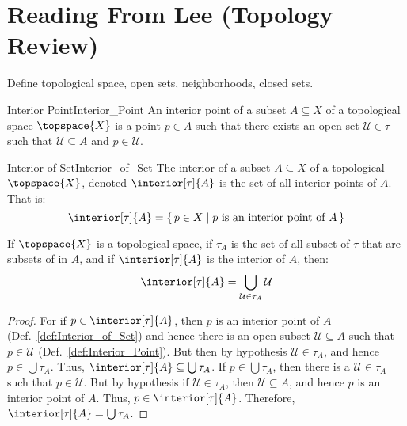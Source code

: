 \documentclass{article}                                                        %
\begin{document}
    \section{Reading From Lee (Topology Review)}
        Define topological space, open sets, neighborhoods, closed sets.
        \begin{fdefinition}{Interior Point}{Interior_Point}
            An interior point of a subset $A\subseteq{X}$ of a topological space
            $\topspace{X}$ is a point $p\in{A}$ such that there exists an open
            set $\mathcal{U}\in\tau$ such that $\mathcal{U}\subseteq{A}$ and
            $p\in\mathcal{U}$.
        \end{fdefinition}
        \begin{fdefinition}{Interior of Set}{Interior_of_Set}
            The interior of a subset $A\subseteq{X}$ of a topological
            $\topspace{X}$, denoted $\interior[\tau]{A}$ is the set of all
            interior points of $A$. That is:
            \begin{equation*}
                \interior[\tau]{A}=\{\,p\in{X}\;|\;p
                    \textrm{ is an interior point of }A\,\}
            \end{equation*}
        \end{fdefinition}
        \begin{theorem}
            If $\topspace{X}$ is a topological space, if
            $\tau_{A}$ is the set of all subset of $\tau$ that are subsets of
            in $A$, and if $\interior[\tau]{A}$ is the interior of $A$, then:
            \begin{equation}
                \interior[\tau]{A}=
                    \bigcup_{\mathcal{U}\in\tau_{A}}\mathcal{U}
            \end{equation}
        \end{theorem}
        \begin{proof}
            For if $p\in\interior[\tau]{A}$, then $p$ is an interior point of
            $A$ (Def.~\ref{def:Interior_of_Set}) and hence there is an open
            subset $\mathcal{U}\subseteq{A}$ such that $p\in\mathcal{U}$
            (Def.~\ref{def:Interior_Point}). But then by hypothesis
            $\mathcal{U}\in\tau_{A}$, and hence $p\in\bigcup\tau_{A}$. Thus,
            $\interior[\tau]{A}\subseteq\bigcup\tau_{A}$. If
            $p\in\bigcup\tau_{A}$, then there is a $\mathcal{U}\in\tau_{A}$
            such that $p\in\mathcal{U}$. But by hypothesis if
            $\mathcal{U}\in\tau_{A}$, then $\mathcal{U}\subseteq{A}$, and hence
            $p$ is an interior point of $A$. Thus, $p\in\interior[\tau]{A}$.
            Therefore, $\interior[\tau]{A}=\bigcup\tau_{A}$.
        \end{proof}
\end{document}
